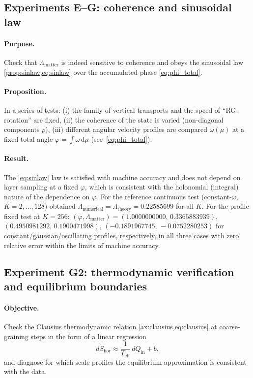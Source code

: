 \documentclass[11pt,a4paper]{article}
\newcommand{\dd}{\mathrm{d}}
\theoremstyle{definition}
\theoremstyle{plain}
\theoremstyle{remark}
\begin{document}
\subsection{Experiments E--G: coherence and sinusoidal law}
\label{sec:numerics:EFG}

\paragraph{Purpose.}
Check that $\Lambda_{\mathrm{matter}}$ is indeed sensitive to coherence
and obeys the sinusoidal law \cref{prop:sinlaw,eq:sinlaw} over the accumulated phase \cref{eq:phi_total}.

\paragraph{Proposition.}
In a series of tests:
(i) the family of vertical transports and the speed of “RG-rotation” are fixed,
(ii) the coherence of the state is varied (non-diagonal components $\rho$),
(iii) different angular velocity profiles are compared $\omega(\mu)$ at a fixed total angle
$\varphi=\int \omega\,\dd\mu$ (see\ \cref{eq:phi_total}).

\paragraph{Result.}
The \cref{eq:sinlaw} law is satisfied with machine accuracy and does not depend on layer sampling at a fixed $\varphi$,
which is consistent with the holonomial (integral) nature of the dependence on $\varphi$.
For the reference continuous test (constant-$\omega$, $K=2,\dots,128$) obtained
$\Lambda_{\mathrm{numerical}}=\Lambda_{\mathrm{theory}}=0.22585699$ for all $K$.
For the profile fixed test at $K=256$:
$(\varphi,\Lambda_{\mathrm{matter}})=
(1.0000000000,\,0.3365883939)$,
$(0.4950981292,\,0.1900471998)$,
$(-0.1891967745,\,-0.0752280253)$
for constant/gaussian/oscillating profiles, respectively, in all three cases with zero relative error
within the limits of machine accuracy.

\subsection{Experiment G2: thermodynamic verification and equilibrium boundaries}
\label{sec:numerics:G2}

\paragraph{Objective.}
Check the Clausius thermodynamic relation \cref{ax:clausius,eq:clausius} at coarse-graining steps
in the form of a linear regression
\begin{equation}\label{eq:Clausius_fit}
dS_{\mathrm{hor}} \approx \frac{1}{T_{\mathrm{eff}}}\, dQ_{\mathrm{in}} + b,
\end{equation}
and diagnose for which scale profiles the equilibrium approximation is consistent with the data.
\end{document}
